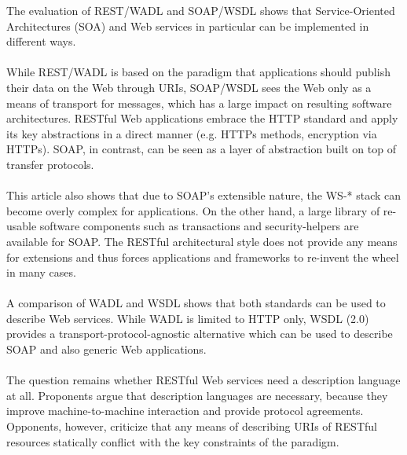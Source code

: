 The evaluation of REST/WADL and SOAP/WSDL shows that Service-Oriented Architectures (SOA) and Web services in particular can be implemented in different ways. 
\\ \\
While REST/WADL is based on the paradigm that applications should publish their data on the Web through URIs, SOAP/WSDL sees the Web only as a means of transport for messages, which has a large impact on resulting software architectures. RESTful Web applications embrace the HTTP standard and apply its key abstractions in a direct manner (e.g. HTTPs methods, encryption via HTTPs). SOAP, in contrast, can be seen as a layer of abstraction built on top of transfer protocols.
\\ \\
This article also shows that due to SOAP's extensible nature, the WS-* stack can become overly complex for applications. On the other hand, a large library of re-usable software components such as transactions and security-helpers are available for SOAP. The RESTful architectural style does not provide any means for extensions and thus forces applications and frameworks to re-invent the wheel in many cases.
\\ \\
A comparison of WADL and WSDL shows that both standards can be used to describe Web services. While WADL is limited to HTTP only, WSDL (2.0) provides a transport-protocol-agnostic alternative which can be used to describe SOAP and also generic Web applications. 
\\ \\
The question remains whether RESTful Web services need a description language at all. Proponents argue that description languages are necessary, because they improve machine-to-machine interaction and provide protocol agreements. Opponents, however, criticize that any means of describing URIs of RESTful resources statically conflict with the key constraints of the paradigm.